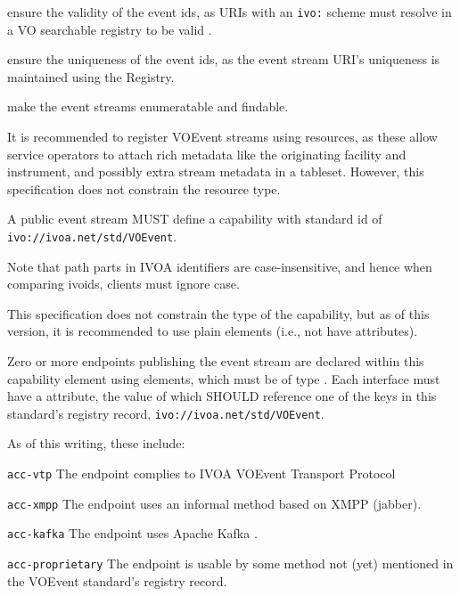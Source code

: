 \documentclass[11pt,a4paper]{ivoa}
\begin{document}
\begin{compactitem}
\item ensure the validity of the event ids, as URIs with an \verb|ivo:|
scheme must resolve in a VO searchable registry to be valid
\citep{2016ivoa.spec.0523D}.
\item ensure the uniqueness of the event ids, as the event stream URI's
uniqueness is maintained using the Registry.
\item make the event streams enumeratable and findable.
\end{compactitem}

It is recommended to register VOEvent streams using
 resources, as these allow service operators
to attach rich metadata like the originating facility and instrument, and
possibly extra stream metadata in a tableset.  However, this
specification does not constrain the resource type.

A public event stream MUST define a capability with standard id of
\nolinkurl{ivo://ivoa.net/std/VOEvent}.

Note that path parts in IVOA identifiers are case-insensitive, and hence
when comparing ivoids, clients must ignore case.

This specification does not constrain the type of the capability, but as
of this version, it is recommended to use plain 
elements (i.e., not have  attributes).

Zero or more endpoints publishing the event stream are declared within
this capability element using  elements, which must
be of type .  Each interface must have
a  attribute, the value of which SHOULD reference one
of the keys in this standard's registry record,
\nolinkurl{ivo://ivoa.net/std/VOEvent}.

As of this writing, these include:

\begin{compactitem}
\item  \verb|acc-vtp| The endpoint complies to IVOA VOEvent Transport
  Protocol \citep{2017ivoa.spec.0320S}
\item \verb|acc-xmpp| The endpoint uses an informal method based on
    	XMPP (jabber).
\item \verb|acc-kafka| The endpoint uses Apache Kafka \citep{TODO}.
\item \verb|acc-proprietary| The endpoint is usable by some
  method not (yet) mentioned in the VOEvent standard's registry record.
\end{compactitem}
\end{document}
